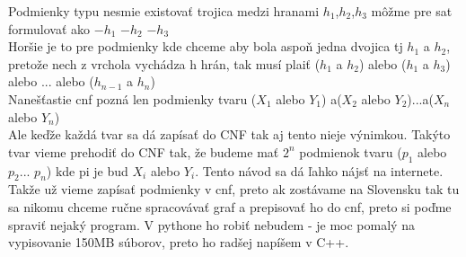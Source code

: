 \documentclass[a4paper,11pt]{article}
\begin{document}
Podmienky typu nesmie existovať trojica medzi hranami $h_1$,$h_2$,$h_3$ môžme pre sat formulovať ako $-h_1$ $-h_2$ $-h_3$\\

Horšie je to pre podmienky kde chceme aby bola aspoň jedna dvojica tj $h_1$ a $h_2$, pretože nech z vrchola vychádza h hrán, tak musí plaiť ($h_1$ a $h_2$) alebo ($h_1$ a $h_3$) alebo ... alebo ($h_{n-1}$ a $h_{n}$)
\\
Nanešťastie cnf pozná len podmienky tvaru ($X_1$ alebo $Y_1$) a($X_2$ alebo $Y_2$)...a($X_n$ alebo $Y_n$)\\
Ale keďže každá tvar sa dá zapísať do CNF tak aj tento nieje výnimkou. Takýto tvar vieme prehodiť do CNF tak, že budeme mať $2^n$ podmienok tvaru ($p_1$ alebo $p_2$... $p_n$) kde pi je bud $X_i$ alebo $Y_i$. Tento návod sa dá ľahko nájsť na internete.
\\

Takže už vieme zapísať podmienky v cnf, preto ak zostávame na Slovensku tak tu sa nikomu chceme ručne spracovávať graf a prepisovať ho do cnf, preto si poďme spraviť nejaký program. V pythone ho robiť nebudem - je moc pomalý na vypisovanie 150MB súborov, preto ho radšej napíšem v C++.


\end{document}
